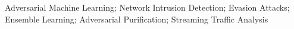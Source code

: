 \acresetall
\noindent Adversarial Machine Learning; Network Intrusion Detection; Evasion Attacks; Ensemble Learning; Adversarial Purification; Streaming Traffic Analysis